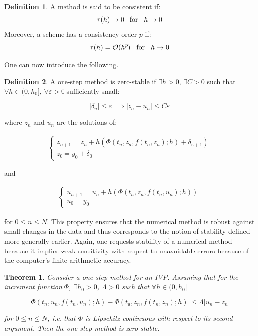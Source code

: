 \documentclass[11pt]{article}
\theoremstyle{theorem}
\newtheorem{theorem}{Theorem}
\theoremstyle{definition}
\newtheorem{definition}{Definition}
\begin{document}
\begin{definition}
	\label{def:consistency}
	A method is said to be consistent if:
	$$\tau(h)\rightarrow 0\hspace{3mm}\text{for}\hspace{3mm}h\rightarrow 0$$
	Moreover, a scheme has a consistency order $p$ if:
	$$\tau(h)=\mathcal{O}(h^p)\hspace{3mm}\text{for}\hspace{3mm}h\rightarrow 0$$
\end{definition}

One can now introduce the following.

\begin{definition}
	\label{def:zero-stability-one-step}
	A one-step method is zero-stable if $\exists h>0$, $\exists C>0$ such that $\forall h\in (0, h_0]$, $\forall\varepsilon>0$ sufficiently small:
	
	$$|\delta_n|\le\varepsilon\implies |z_n-u_n|\le C\varepsilon$$
	
	where $z_n$ and $u_n$ are the solutions of:
	
	\begin{align*}
	\begin{cases}
	z_{n+1}=z_n+h\left(\Phi(t_n, z_n, f(t_n, z_n);h)+\delta_{n+1}\right)\\
	z_0=y_0+\delta_0
	\end{cases}
	\end{align*}
	
	and 
	
	\begin{align*}
	\begin{cases}
	u_{n+1}=u_n+h\left(\Phi(t_n, z_n, f(t_n, u_n);h)\right)\\
	u_0=y_0
	\end{cases}
	\end{align*}
	
	for $0\le n\le N$.
	This property ensures that the numerical method is robust against small changes in
	the data and thus corresponds to the notion of stability defined more generally earlier. Again, one requests stability of a numerical method because it implies weak sensitivity with respect to unavoidable errors because of the computer’s finite arithmetic accuracy.
\end{definition}

\begin{theorem}
	\label{thm:zero-stability}
	Consider a one-step method for an IVP. Assuming that for the increment function $\Phi$, $\exists h_0>0$, $\Lambda>0$ such that $\forall h\in(0, h_0]$
	
	
	$$|\Phi(t_n, u_n, f(t_n, u_n);h)-\Phi(t_n, z_n,f(t_n, z_n);h)|\le\Lambda|u_n-z_n|$$
	
	for $0\le n\le N$, i.e. that $\Phi$ is Lipschitz continuous with respect to its second argument. Then the one-step method is zero-stable.\\
\end{theorem}
\end{document}
